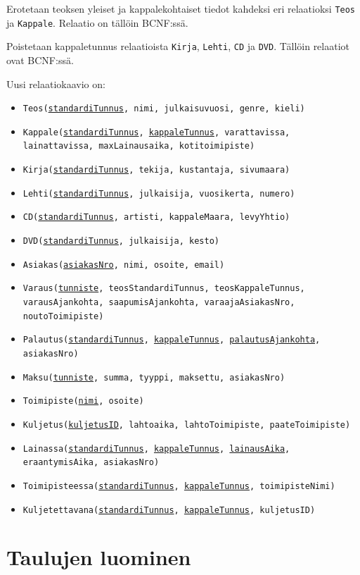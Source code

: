 \documentclass[12pt,titlepage] {article}
\begin{document}
Erotetaan teoksen yleiset ja kappalekohtaiset tiedot kahdeksi eri relaatioksi \texttt{Teos} ja \texttt{Kappale}. Relaatio on tällöin BCNF:ssä.

Poistetaan kappaletunnus relaatioista \texttt{Kirja}, \texttt{Lehti}, \texttt{CD} ja \texttt{DVD}. Tällöin relaatiot ovat BCNF:ssä.

Uusi relaatiokaavio on:

\begin{itemize}
	\item \texttt{Teos(\underline{standardiTunnus}, nimi, julkaisuvuosi, genre, kieli)}
	\item \texttt{Kappale(\underline{standardiTunnus}, \underline{kappaleTunnus}, varattavissa, lainattavissa, maxLainausaika, kotitoimipiste)}
	\item \texttt{Kirja(\underline{standardiTunnus}, tekija, kustantaja, sivumaara)}
	\item \texttt{Lehti(\underline{standardiTunnus}, julkaisija, vuosikerta, numero)}
	\item \texttt{CD(\underline{standardiTunnus}, artisti, kappaleMaara, levyYhtio)}
	\item \texttt{DVD(\underline{standardiTunnus}, julkaisija, kesto)}
	\item \texttt{Asiakas(\underline{asiakasNro}, nimi, osoite, email)}
	\item \texttt{Varaus(\underline{tunniste}, teosStandardiTunnus, teosKappaleTunnus, varausAjankohta, saapumisAjankohta, varaajaAsiakasNro, noutoToimipiste)}
	\item \texttt{Palautus(\underline{standardiTunnus}, \underline{kappaleTunnus}, \underline{palautusAjankohta}, asiakasNro)}
	\item \texttt{Maksu(\underline{tunniste}, summa, tyyppi, maksettu, asiakasNro)}
	\item \texttt{Toimipiste(\underline{nimi}, osoite)}
	\item \texttt{Kuljetus(\underline{kuljetusID}, lahtoaika, lahtoToimipiste, paateToimipiste)}
\end{itemize}

\begin{itemize}
	\item \texttt{Lainassa(\underline{standardiTunnus}, \underline{kappaleTunnus}, \underline{lainausAika}, eraantymisAika, asiakasNro)}
	\item \texttt{Toimipisteessa(\underline{standardiTunnus}, \underline{kappaleTunnus}, toimipisteNimi)}
	\item \texttt{Kuljetettavana(\underline{standardiTunnus}, \underline{kappaleTunnus}, kuljetusID)}
\end{itemize}

\section {Taulujen luominen}


\end{document}
